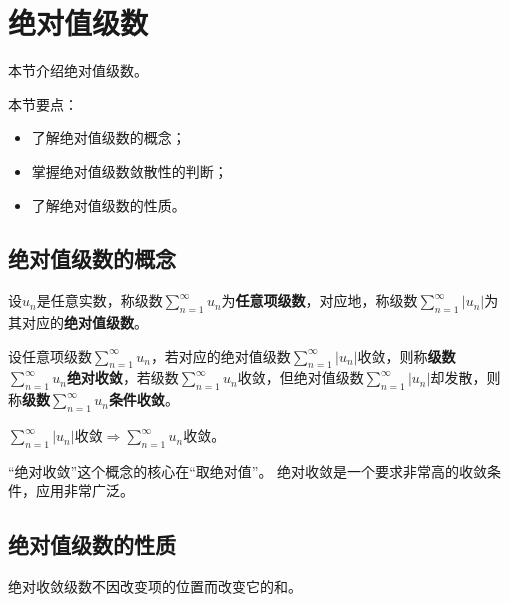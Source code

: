 \section{绝对值级数}

本节介绍绝对值级数。

本节要点：
\begin{itemize}
    \item 了解绝对值级数的概念；
    \item 掌握绝对值级数敛散性的判断；
    \item 了解绝对值级数的性质。
\end{itemize}

\subsection{绝对值级数的概念}

\begin{definition}[绝对值级数]
设$u_n$是任意实数，称级数$\sum_{n=1}^{\infty}{u_n}$为{\bf 任意项级数}，对应地，称级数$\sum_{n=1}^{\infty}{\left| u_n \right|}$为其对应的{\bf 绝对值级数}。
\end{definition}

\begin{definition}[绝对收敛]
设任意项级数$\sum_{n=1}^{\infty}{u_n}$，若对应的绝对值级数$\sum_{n=1}^{\infty}{\left| u_n \right|}$收敛，则称{\bf 级数$\sum_{n=1}^{\infty}{u_n}$绝对收敛}，若级数$\sum_{n=1}^{\infty}{u_n}$收敛，但绝对值级数$\sum_{n=1}^{\infty}{\left| u_n \right|}$却发散，则称{\bf 级数$\sum_{n=1}^{\infty}{u_n}$条件收敛}。
\end{definition}

\begin{theorem}
$\sum_{n=1}^{\infty}{\left| u_n \right|} \text{收敛} \Rightarrow \sum_{n=1}^{\infty}{u_n} \text{收敛}$。
\end{theorem}

“绝对收敛”这个概念的核心在“取绝对值”。
绝对收敛是一个要求非常高的收敛条件，应用非常广泛。

\subsection{绝对值级数的性质}

\begin{theorem}[可交换性]
绝对收敛级数不因改变项的位置而改变它的和。
\end{theorem}

